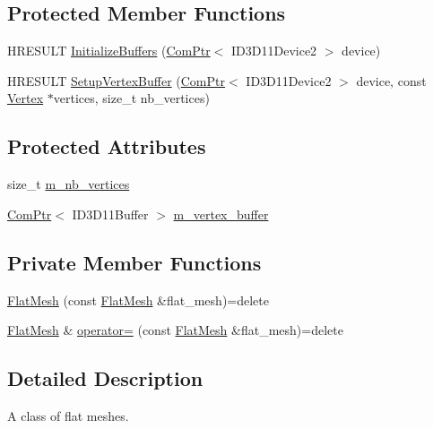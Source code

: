 \subsection*{Protected Member Functions}
\begin{DoxyCompactItemize}
\item 
H\+R\+E\+S\+U\+LT \hyperlink{classmage_1_1_flat_mesh_a8a6e94c0abc2042f08f48ae3241fbd7d}{Initialize\+Buffers} (\hyperlink{namespacemage_ae74f374780900893caa5555d1031fd79}{Com\+Ptr}$<$ I\+D3\+D11\+Device2 $>$ device)
\item 
H\+R\+E\+S\+U\+LT \hyperlink{classmage_1_1_flat_mesh_a20f802d719086457fa15e66026d86f06}{Setup\+Vertex\+Buffer} (\hyperlink{namespacemage_ae74f374780900893caa5555d1031fd79}{Com\+Ptr}$<$ I\+D3\+D11\+Device2 $>$ device, const \hyperlink{structmage_1_1_vertex}{Vertex} $\ast$vertices, size\+\_\+t nb\+\_\+vertices)
\end{DoxyCompactItemize}
\subsection*{Protected Attributes}
\begin{DoxyCompactItemize}
\item 
size\+\_\+t \hyperlink{classmage_1_1_flat_mesh_aabb71e0a08a465ca439e444c2325d29f}{m\+\_\+nb\+\_\+vertices}
\item 
\hyperlink{namespacemage_ae74f374780900893caa5555d1031fd79}{Com\+Ptr}$<$ I\+D3\+D11\+Buffer $>$ \hyperlink{classmage_1_1_flat_mesh_ab02d4e6870b91ddc4d5520cd723803c5}{m\+\_\+vertex\+\_\+buffer}
\end{DoxyCompactItemize}
\subsection*{Private Member Functions}
\begin{DoxyCompactItemize}
\item 
\hyperlink{classmage_1_1_flat_mesh_ac352a78256d4f04223f05f1535a35173}{Flat\+Mesh} (const \hyperlink{classmage_1_1_flat_mesh}{Flat\+Mesh} \&flat\+\_\+mesh)=delete
\item 
\hyperlink{classmage_1_1_flat_mesh}{Flat\+Mesh} \& \hyperlink{classmage_1_1_flat_mesh_a47cf3984f09b850a02e130e6c57260b4}{operator=} (const \hyperlink{classmage_1_1_flat_mesh}{Flat\+Mesh} \&flat\+\_\+mesh)=delete
\end{DoxyCompactItemize}


\subsection{Detailed Description}
A class of flat meshes. 

